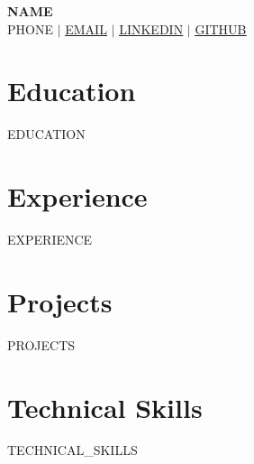 \documentclass[letterpaper,11pt]{article}
\newcommand{\resumeSubHeadingListStart}{\begin{itemize}[leftmargin=0.15in, label={}]}
\newcommand{\resumeSubHeadingListEnd}{\end{itemize}}
\begin{document}
\begin{center}
    \textbf{\Huge \scshape {{NAME}}} \\ \vspace{1pt}
    \small {{PHONE}} $|$ 
    \href{mailto:{{EMAIL}}}{\underline{{{EMAIL}}}} $|$
    \href{https://linkedin.com/in/{{LINKEDIN}}}{\underline{{{LINKEDIN}}}} $|$
    \href{https://github.com/{{GITHUB}}}{\underline{{{GITHUB}}}}
\end{center}

\section{Education}
  \resumeSubHeadingListStart
    {{EDUCATION}}
  \resumeSubHeadingListEnd

\section{Experience}
  \resumeSubHeadingListStart
    {{EXPERIENCE}}
  \resumeSubHeadingListEnd

\section{Projects}
  \resumeSubHeadingListStart
    {{PROJECTS}}
  \resumeSubHeadingListEnd

\section{Technical Skills}
  \begin{itemize}[leftmargin=0.15in, label={}]
    \small{\item{
      {{TECHNICAL_SKILLS}}
    }}
  \end{itemize}
\end{document}
